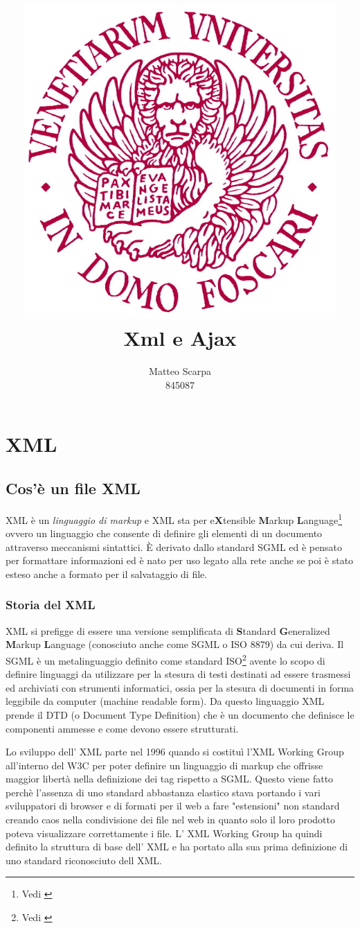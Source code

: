 \documentclass[a4paper,12pt]{report}
\title{\includegraphics[width=120mm]{logo-unive.png} \\ Xml e Ajax}
\author{Matteo Scarpa\\ 845087}
\date{}
\begin{document}
\maketitle
\newpage

\chapter{XML}
\section{Cos'è un file XML}
XML è un \textit{linguaggio di markup} e XML sta per e\textbf{X}tensible \textbf{M}arkup \textbf{L}anguage\footnote{Vedi \cite{site:w3cxml}} ovvero un linguaggio che consente di definire gli elementi di un documento attraverso meccanismi sintattici.
È derivato dallo standard SGML  ed è pensato per formattare informazioni ed è nato per uso legato alla rete anche se poi è stato esteso anche a formato per il salvataggio di file.

\subsection{Storia del XML}
XML si prefigge di essere una versione semplificata di \textbf{S}tandard \textbf{G}eneralized \textbf{M}arkup \textbf{L}anguage (conosciuto anche come SGML o ISO 8879) da cui deriva.
Il SGML è un metalinguaggio definito come standard ISO\footnote{Vedi \cite{site:isosgml}} avente lo scopo di definire linguaggi da utilizzare per la stesura di testi destinati ad essere trasmessi ed archiviati con strumenti informatici, ossia per la stesura di documenti in forma leggibile da computer (machine readable form). Da questo linguaggio XML prende il DTD (o Document Type Definition) che è un documento che definisce le componenti ammesse e come devono essere strutturati.

Lo sviluppo dell' XML parte nel 1996 quando si costituì l’XML Working Group all'interno del W3C per poter definire un linguaggio di markup che offrisse maggior libertà nella definizione dei tag rispetto a SGML. Questo viene fatto perchè l'assenza di uno standard abbastanza elastico stava portando i vari sviluppatori di browser e di formati per il web a fare "estensioni" non standard creando caos nella condivisione dei file nel web in quanto solo il loro prodotto poteva visualizzare correttamente i file.
L' XML Working Group ha quindi definito la struttura di base dell' XML e ha portato alla sua prima definizione di uno standard riconosciuto dell XML. 
\end{document}
